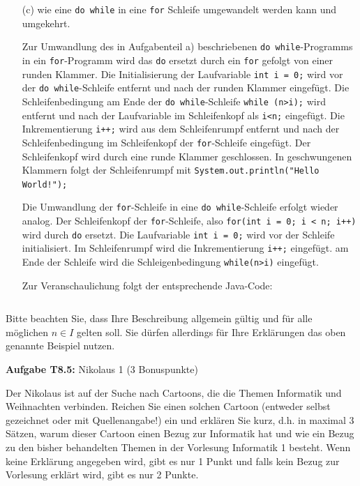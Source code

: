 \begin{itemize}
  \item [(c)] wie eine \texttt{do while} in eine \texttt{for} Schleife umgewandelt werden kann und umgekehrt.
  
  Zur Umwandlung des in Aufgabenteil a) beschriebenen \texttt{do while}-Programms 
  in ein \texttt{for}-Programm wird das \texttt{do} ersetzt durch ein \texttt{for} gefolgt von
  einer runden Klammer. Die Initialisierung der Laufvariable \texttt{int i = 0;} wird 
  vor der \texttt{do while}-Schleife entfernt und nach der runden
  Klammer eingefügt. Die Schleifenbedingung am Ende der \texttt{do while}-Schleife
  \texttt{while (n>i);} wird entfernt und nach der Laufvariable im Schleifenkopf als
  \texttt{i<n;} eingefügt. Die Inkrementierung \texttt{i++;} wird aus dem
  Schleifenrumpf entfernt und nach der Schleifenbedingung im Schleifenkopf der \texttt{for}-Schleife
  eingefügt. Der Schleifenkopf wird durch eine runde Klammer geschlossen. In
  geschwungenen Klammern folgt der Schleifenrumpf mit \texttt{System.out.println("Hello World!");}

  Die Umwandlung der \texttt{for}-Schleife in eine \texttt{do while}-Schleife erfolgt wieder analog.
  Der Schleifenkopf der \texttt{for}-Schleife, also \texttt{for(int i = 0; i < n; i++)} wird
  durch \texttt{do} ersetzt. Die Laufvariable \texttt{int i = 0;} wird
  vor der Schleife initialisiert. Im Schleifenrumpf wird die Inkrementierung \texttt{i++;} eingefügt. 
  am Ende der Schleife wird die Schleigenbedingung \texttt{while(n>i)} eingefügt.
  
  Zur Veranschaulichung folgt der entsprechende Java-Code:
  \begin{itemize}
    \item [] \inputminted[]{Java}{A8_4_do_while.java}
  \end{itemize}

\end{itemize}

Bitte beachten Sie, dass Ihre Beschreibung allgemein gültig und für alle möglichen $n \in I$ gelten soll. Sie dürfen allerdings für Ihre Erklärungen das oben genannte Beispiel nutzen.

\newpage

\textbf{Aufgabe T8.5:} Nikolaus 1 (3 Bonuspunkte)

Der Nikolaus ist auf der Suche nach Cartoons, die die Themen Informatik und Weihnachten verbinden. Reichen Sie einen solchen Cartoon (entweder selbst gezeichnet oder mit Quellenangabe!) ein und erklären Sie kurz, d.h. in maximal 3 Sätzen, warum dieser Cartoon einen Bezug zur Informatik hat und wie ein Bezug zu den bisher behandelten Themen in der Vorlesung Informatik 1 besteht. Wenn keine Erklärung angegeben wird, gibt es nur 1 Punkt und falls kein Bezug zur Vorlesung erklärt wird, gibt es nur 2 Punkte.


